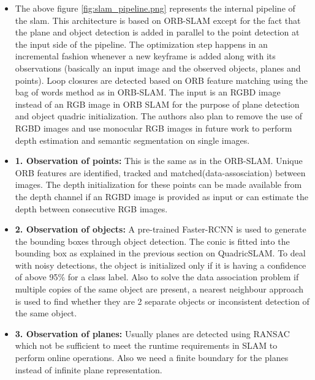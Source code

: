 \documentclass[report.tex]{subfiles}
\begin{document}
\begin{itemize}
\item The above figure \ref{fig:slam_pipeline.png} represents the internal pipeline of the slam. This architecture is based on ORB-SLAM except for the fact that the plane and object detection is added in parallel to the point detection at the input side of the pipeline. The optimization step happens in an incremental fashion whenever a new keyframe is added along with its observations (basically an input image and the observed objects, planes and points). Loop closures are detected based on ORB feature matching using the bag of words method as in ORB-SLAM. The input is an RGBD image instead of an RGB image in ORB SLAM for the purpose of plane detection and object quadric initialization. The authors also plan to remove the use of RGBD images and use monocular RGB images in future work to perform depth estimation and semantic segmentation on single images.
\item \textbf{1. Observation of points: } This is the same as in the ORB-SLAM. Unique ORB features are identified, tracked and matched(data-assosciation) between images. The depth initialization for these points can be made available from the depth channel if an RGBD image is provided as input or can estimate the depth between consecutive RGB images.
\item \textbf{2. Observation of objects: } A pre-trained Faster-RCNN is used to generate the bounding boxes through object detection. The conic is fitted into the bounding box as explained in the previous section on QuadricSLAM. To deal with noisy detections, the object is initialized only if it is having a confidence of above 95\% for a class label. Also to solve the data association problem if multiple copies of the same object are present, a nearest neighbour approach is used to find whether they are 2 separate objects or inconsistent detection of the same object.
\item \textbf{3. Observation of planes: } Usually planes are detected using RANSAC which not be sufficient to meet the runtime requirements in SLAM to perform online operations. Also we need a finite boundary for the planes instead of infinite plane representation.

\end{itemize}
\end{document}
